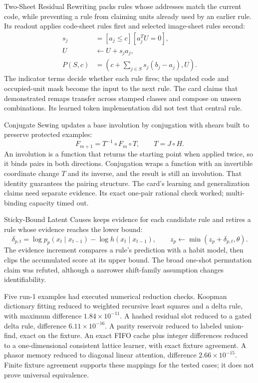 Two-Sheet Residual Rewriting packs rules whose addresses match the current code, while preventing a rule from claiming units already used by an earlier rule. Its readout applies code-sheet rules first and selected image-sheet rules second:
\begin{equation}
\begin{aligned}
s_j&=[a_j\le c][a_j^TU=0],\\
U&\leftarrow U+s_ja_j,\\
P(S,c)&=\left(c+\sum_{j\in S}s_j(b_j-a_j),U\right).
\end{aligned}
\end{equation}
The indicator terms decide whether each rule fires; the updated code and occupied-unit mask become the input to the next rule. The card claims that demonstrated remaps transfer across stamped classes and compose on unseen combinations. Its learned token implementation did not test that central rule.

Conjugate Sewing updates a base involution by conjugation with shears built to preserve protected examples:
\begin{equation}
F_{m+1}=T^{-1}\circ F_m\circ T,\qquad T=J\circ H.
\end{equation}
An involution is a function that returns the starting point when applied twice, so it binds pairs in both directions. Conjugation wraps a function with an invertible coordinate change $T$ and its inverse, and the result is still an involution. That identity guarantees the pairing structure. The card's learning and generalization claims need separate evidence. Its exact one-pair rational check worked; multi-binding capacity timed out.

Sticky-Bound Latent Causes keeps evidence for each candidate rule and retires a rule whose evidence reaches the lower bound:
\begin{equation}
\delta_{p,t}=\log p_p(x_t\mid x_{t-1})-\log h(x_t\mid x_{t-1}),\qquad z_p\leftarrow\min(z_p+\delta_{p,t},\theta).
\end{equation}
The evidence increment compares a rule's prediction with a habit model, then clips the accumulated score at its upper bound. The broad one-shot permutation claim was refuted, although a narrower shift-family assumption changes identifiability.

Five run-1 examples had executed numerical reduction checks. Koopman dictionary fitting reduced to weighted recursive least squares and a delta rule, with maximum difference $1.84\times10^{-11}$. A hashed residual slot reduced to a gated delta rule, difference $6.11\times10^{-16}$. A parity reservoir reduced to labeled union-find, exact on the fixture. An exact FIFO cache plus integer differences reduced to a one-dimensional consistent lattice learner, with exact fixture agreement. A phasor memory reduced to diagonal linear attention, difference $2.66\times10^{-15}$. Finite fixture agreement supports these mappings for the tested cases; it does not prove universal equivalence.

